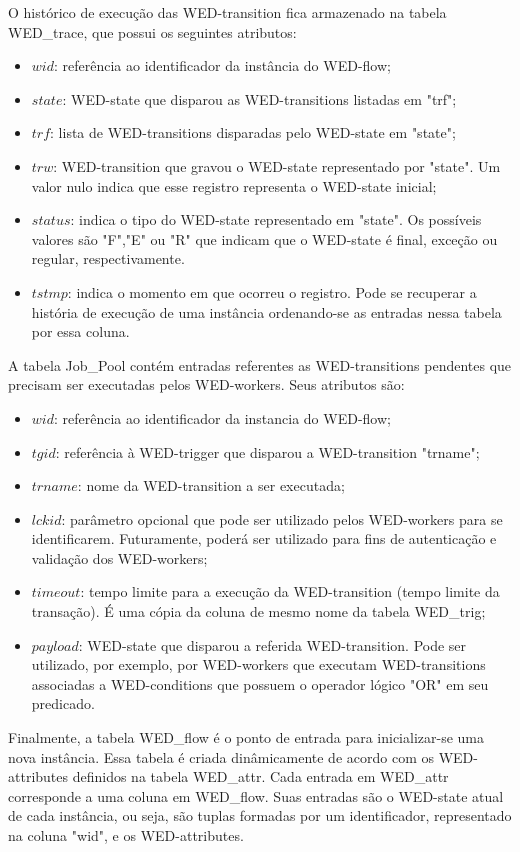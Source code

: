 \documentclass[conference]{IEEEtran}
\begin{document}
O histórico de execução das WED-transition fica armazenado na tabela WED\_trace, que possui os seguintes atributos:
\begin{itemize}  
\item $wid$: referência ao identificador da instância do WED-flow;
\item $state$: WED-state que disparou as WED-transitions listadas em "trf";
\item $trf$: lista de WED-transitions disparadas pelo WED-state em "state";
\item $trw$: WED-transition que gravou o WED-state representado por "state". Um valor nulo indica que esse registro representa o WED-state inicial;
\item $status$: indica o tipo do WED-state representado em "state". Os possíveis valores são "F","E" ou "R" que indicam que o WED-state
           é final, exceção ou regular, respectivamente.
\item $tstmp$: indica o momento em que ocorreu o registro. Pode se recuperar a história de execução de uma instância ordenando-se
          as entradas nessa tabela por essa coluna.
\end{itemize}
  A tabela Job\_Pool contém entradas referentes as WED-transitions pendentes que precisam ser executadas pelos WED-workers.
Seus atributos são:
\begin{itemize}  
\item $wid$: referência ao identificador da instancia do WED-flow;
\item $tgid$: referência à WED-trigger que disparou a WED-transition "trname";
\item $trname$: nome da WED-transition a ser executada;
\item $lckid$: parâmetro opcional que pode ser utilizado pelos WED-workers para se identificarem. Futuramente, poderá ser utilizado
          para fins de autenticação e validação dos WED-workers;
\item $timeout$: tempo limite para a execução da WED-transition (tempo limite da transação). É uma cópia da coluna de mesmo
            nome da tabela WED\_trig;
\item $payload$: WED-state que disparou a referida WED-transition. Pode ser utilizado, por exemplo, por
            WED-workers que executam WED-transitions associadas a WED-conditions que possuem o operador lógico "OR" em 
            seu predicado.
\end{itemize}
  Finalmente, a tabela WED\_flow é o ponto de entrada para inicializar-se uma nova instância. Essa tabela é criada dinâmicamente
de acordo com os WED-attributes definidos na tabela WED\_attr. Cada entrada em WED\_attr corresponde a uma coluna em WED\_flow.
Suas entradas são o WED-state atual de cada instância, ou seja, são tuplas formadas por um identificador, representado
na coluna "wid", e os WED-attributes. 
\end{document}
